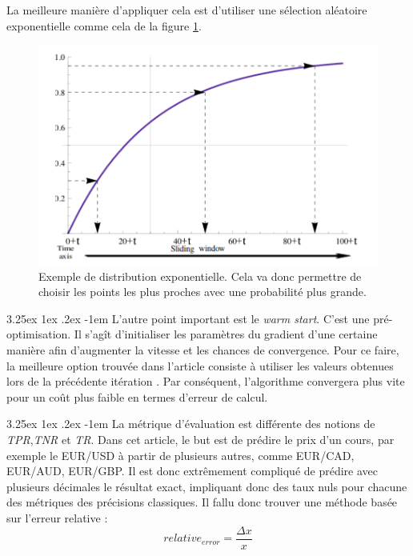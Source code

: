 \documentclass[a4paper, 11pt]{article}
\makeatletter
\renewcommand\paragraph{\@startsection{paragraph}{5}{\z@}%
  {3.25ex \@plus1ex \@minus.2ex}%
  {-1em}%
  {\normalfont\normalsize\bfseries}}
\makeatother
\begin{document}
La meilleure manière d'appliquer cela est d'utiliser une sélection aléatoire exponentielle comme cela de la figure \ref{choix_exp}.

\begin{figure}[H]
\centering
\includegraphics[scale=0.40]{images/choix_exp}
\caption[]{Exemple de distribution exponentielle\footnotemark.
Cela va donc permettre de choisir les points les plus proches avec une probabilité plus grande.}
\label{choix_exp}
\end{figure}


\paragraph{}
L'autre point important est le \textit{warm start}. C'est une pré-optimisation.
Il s'agît d'initialiser les paramètres du gradient d'une certaine manière afin d'augmenter la vitesse et les chances
de convergence. Pour ce faire, la meilleure option trouvée dans l'article consiste à utiliser les valeurs obtenues lors de la précédente itération
\cite{descente_du_gradient_stochastique}.
Par conséquent, l'algorithme convergera plus vite pour un coût plus faible en termes d'erreur de calcul.

\paragraph{}
La métrique d'évaluation est différente des notions de \textit{TPR},\textit{TNR} et \textit{TR}.
Dans cet article, le but est de prédire le prix d'un cours, par exemple le EUR/USD à partir de plusieurs autres,
comme EUR/CAD, EUR/AUD, EUR/GBP. Il est donc extrêmement compliqué de prédire avec plusieurs décimales
le résultat exact, impliquant donc des taux nuls pour chacune des métriques des précisions classiques.
Il fallu donc trouver une méthode basée sur l'erreur relative :
$$relative_{error} = \frac{\Delta x}{x}$$
\end{document}
